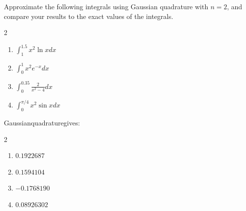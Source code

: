%
\begin{myexercise}%
Approximate the following integrals using Gaussian quadrature with $n=2$, and compare your results to the exact values of the integrals.
\begin{multicols}{2}
\begin{enumerate}[label=(\alph*)]
\item $\int_{1}^{1.5} x^{2} \ln x d x$
\item $\int_{0}^{1} x^{2} e^{-x} d x$
\item $\int_{0}^{0.35} \frac{2}{x^{2}-4} d x$
\item $\int_{0}^{\pi / 4} x^{2} \sin x d x$
\end{enumerate}
\end{multicols}

\begin{mysolution}
Gaussianquadraturegives:
\begin{multicols}{2}
\begin{enumerate}[label=(\alph*)]
\item $0.1922687$ \item $0.1594104$ \item $-0.1768190$ \item $0.08926302$ 
\end{enumerate}
\end{multicols}
\end{mysolution}
\end{myexercise}


